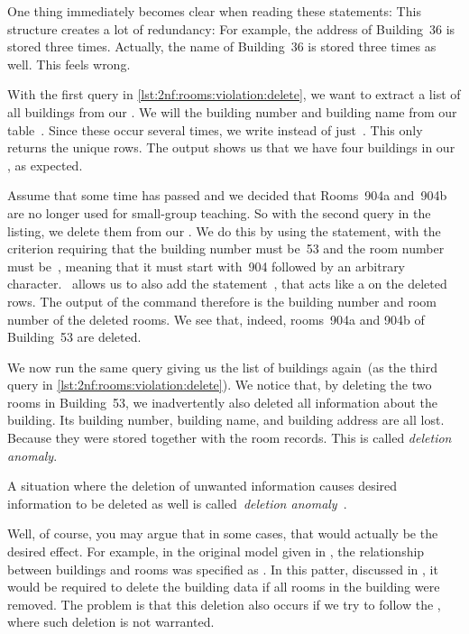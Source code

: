One thing immediately becomes clear when reading these  statements:
This structure creates a lot of redundancy:
For example, the address of Building~36 is stored three times.
Actually, the name of Building~36 is stored three times as well.
This feels wrong.

With the first query in \cref{lst:2nf:rooms:violation:delete}, we want to extract a list of all buildings from our \db.
We will  the building number and building name from our table~.
Since these occur several times, we write  instead of just~.
This only returns the unique rows.
The output shows us that we have four buildings in our \db, as expected.

Assume that some time has passed and we decided that Rooms~904a and~904b are no longer used for small-group teaching.
So with the second query in the listing, we delete them from our \db.
We do this by using the  statement, with the~ criterion requiring that the building number must be~53 and the room number must be~, meaning that it must start with~904 followed by an arbitrary character.
\postgresql\ allows us to also add the  statement~\cite{PGDG:PD:RDFMR}, that acts like a  on the deleted rows.
The output of the command therefore is the building number and room number of the deleted rooms.
We see that, indeed, rooms~904a and 904b of Building~53 are deleted.

We now run the same query giving us the list of buildings again~(as the third query in \cref{lst:2nf:rooms:violation:delete}).
We notice that, by deleting the two rooms in Building~53, we inadvertently also deleted all information about the building.
Its building number, building name, and building address are all lost.
Because they were stored together with the room records.
This is called \emph{deletion anomaly}.%
%
\begin{definition}%
\label{def:deletionAnomaly}%
A situation where the deletion of unwanted information causes desired information to be deleted as well is called~\emph{deletion anomaly}~\cite{S2024D:RNDAFDNF}.%
\end{definition}%
%
Well, of course, you may argue that in some cases, that would actually be the desired effect.
For example, in the original model given in , the relationship between buildings and rooms was specified as .
In this patter, discussed in , it would be required to delete the building data if all rooms in the building were removed.
The problem is that this deletion also occurs if we try to follow the , where such deletion is not warranted.

